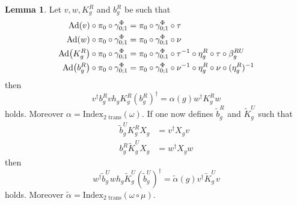 \documentclass[12pt,a4paper,twoside]{article}
\let\originalleft\left
\let\originalright\right
\renewcommand{\left}{\mathopen{}\mathclose\bgroup\originalleft}
\renewcommand{\right}{\aftergroup\egroup\originalright}
\newcommand{\Ad}[1]{\textrm{Ad}\left(#1\right)}
\theoremstyle{definition}
\newtheorem{lemma}[theorem]{Lemma}
\numberwithin{equation}{section}
\begin{document}
\begin{lemma}
	Let $v,w,K_g^R$ and $b_g^R$ be such that
	\begin{align}
		\Ad{v}\circ\pi_0\circ\gamma^\Phi_{0;1}&=\pi_0\circ\gamma^\Phi_{0;1}\circ\tau\\
		\Ad{w}\circ\pi_0\circ\gamma^\Phi_{0;1}&=\pi_0\circ\gamma^\Phi_{0;1}\circ\nu\\
		\Ad{K_g^R}\circ\pi_0\circ\gamma^\Phi_{0;1}&=\pi_0\circ\gamma^\Phi_{0;1}\circ\tau^{-1}\circ\eta_g^R\circ\tau\circ\beta_g^{RU}\\
		\Ad{b_g^R}\circ\pi_0\circ\gamma^\Phi_{0;1}&=\pi_0\circ\gamma^\Phi_{0;1}\circ\nu^{-1}\circ\eta_g^R\circ\nu\circ(\eta_g^R)^{-1}
	\end{align}
	then
	\begin{equation}\label{eq:H^1IndexRotationInvariantHorizontalIndex}
		v^\dagger b_g^R vh_g K_g^R (b_g^R)^\dagger=\alpha(g)w^\dagger K_g^R w
	\end{equation}
	holds. Moreover $\alpha=\textrm{Index}_{\text{2 trans}}(\omega)$. If one now defines $\tilde{b}_g^R$ and $\tilde{K}_g^U$ such that
	\begin{align}
		\label{eq:H^1IndexRotationInvariantFirstDefinition}
		\tilde{b}_g^UK_g^R X_g&=v^\dagger X_g v\\
		\label{eq:H^1IndexRotationInvariantSecondDefinition}
		b_g^R\tilde{K}_g^UX_g&=w^\dagger X_g w
	\end{align}
	then
	\begin{equation}\label{eq:H^1IndexRotationInvariantVerticalIndex}
		w^\dagger \tilde b_g^U wh_g \tilde K_g^U (\tilde b_g^U)^\dagger=\tilde\alpha(g)v^\dagger \tilde K_g^U v
	\end{equation}
	holds. Moreover $\tilde\alpha=\textrm{Index}_{\text{2 trans}}(\omega\circ\mu)$.
\end{lemma}
\end{document}
